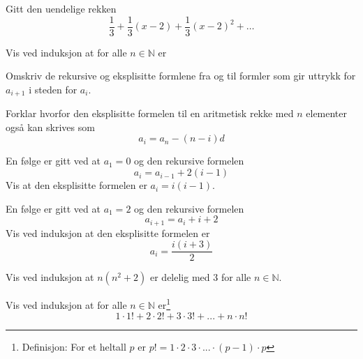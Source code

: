 Gitt den uendelige rekken
\[\frac{1}{3} +\frac{1}{3}(x-2)+ \frac{1}{3}(x-2)^2+\ldots\]

\nes
{}
Vis ved induksjon at for alle $ n\in \mathbb{N} $ er\os
{}

\newpage
{}
Omskriv de rekursive og eksplisitte formlene fra  og  til formler som gir uttrykk for $a_{i+1}$ i steden for $a_i$. \vsk

Forklar hvorfor den eksplisitte formelen til en aritmetisk rekke med $n$ elementer også kan skrives som
\[ a_i=a_n-(n-i)d \]

En følge er gitt ved at $a_1=0$ og den rekursive formelen
\[ a_i=a_{i-1}+2(i-1) \] 
Vis at den eksplisitte formelen er $a_i=i(i-1)$.

En følge er gitt ved at $a_1=2$ og den rekursive formelen
\[ a_{i+1}=a_i+i+2 \]
Vis ved induksjon at den eksplisitte formelen er
\[ a_i=\frac{i(i+3)}{2} \]

Vis ved induksjon at $ n(n^2+2) $ er delelig med 3 for alle $ n\in\mathbb{N} $.

Vis ved induksjon at for alle $n\in\mathbb{N}$ er\footnote{Definisjon: For et heltall $p$ er $p!=1\cdot2\cdot3\cdot...\cdot(p-1)\cdot p$}
\[ 1\cdot1! + 2\cdot2!+3\cdot3!+...+n\cdot n! \]


